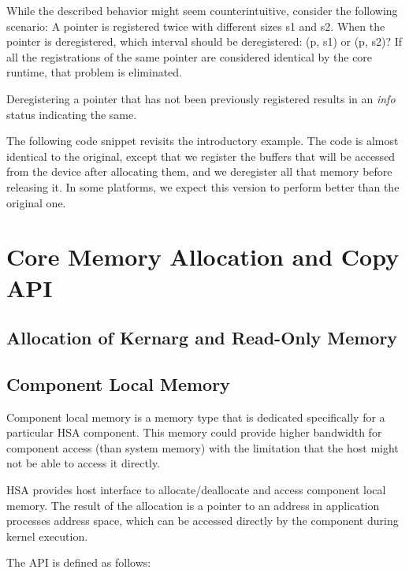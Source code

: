 While the described behavior might seem counterintuitive, consider
the following scenario\-: A pointer is registered twice with
different sizes s1 and s2. When the pointer is deregistered, which
interval should be deregistered\-: (p, s1) or (p, s2)? If all the
registrations of the same pointer are considered identical by the
core runtime, that problem is eliminated.

Deregistering a pointer that has not been previously registered
results in an \emph{info} status indicating the same.

The following code snippet revisits the introductory example. The
code is almost identical to the original, except that we register
the buffers that will be accessed from the device after allocating
them, and we deregister all that memory before releasing it. In some
platforms, we expect this version to perform better than the
original one.

\hypertarget{coreapi_device_memory}{}\section{Core Memory Allocation
and Copy API}\label{coreapi_device_memory}

\hypertarget{coreapi_kernarg}{}\subsection{Allocation of Kernarg and
Read-Only Memory}\label{kernargmem}


\hypertarget{coreapi_device_memory}{}\subsection{Component Local Memory}\label{coreapi_device_memory}

Component local memory is a memory type that is dedicated
specifically for a particular HSA component. This memory could
provide higher bandwidth for component access (than system memory)
with the limitation that the host might not be able to access it
directly.

H\-S\-A provides host interface to allocate/deallocate and access
component local memory. The result of the allocation is a pointer to an
address in application processes address space, which can be
accessed directly by the component during kernel execution.

The API is defined as follows:



